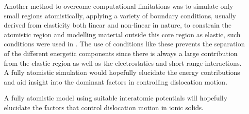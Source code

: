 Another method to overcome computational limitations was to simulate only small regions atomistically, applying a variety of boundary conditions, usually derived from elasticity both linear and non-linear in nature, to constrain the atomistic region and modelling material outside this core region as elastic, such conditions were used in \cite{Woo1977}. The use of conditions like these prevents the separation of the different energetic components since there is always a large contribution from the elastic region as well as the electrostatics and short-range interactions. A fully atomistic simulation would hopefully elucidate the energy contributions and aid insight into the dominant factors in controlling dislocation motion.

A fully atomistic model using suitable interatomic potentials will hopefully elucidate the factors that control dislocation motion in ionic solids.

































